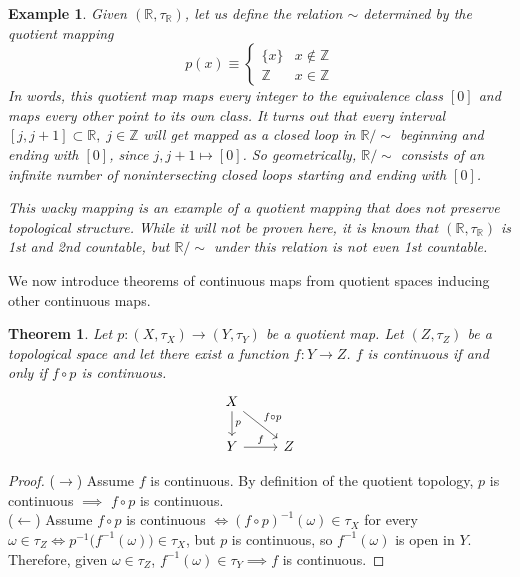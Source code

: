 \documentclass{article}
\newtheorem{theorem}{Theorem}[section]
\newtheorem{example}{Example}[section]
\theoremstyle{remark}
\theoremstyle{definition}
\begin{document}
\begin{example}
Given $(\mathbb{R}, \tau_{\mathbb{R}})$, let us define the relation $\sim$ determined by the quotient mapping
\[p(x) \equiv \begin{cases}
      \{x\} & x \not\in \mathbb{Z} \\
      \mathbb{Z} & x \in \mathbb{Z}
\end{cases}\]
In words, this quotient map maps every integer to the equivalence class $[0]$ and maps every other point to its own class. It turns out that every interval $[j, j+1] \subset \mathbb{R}, \; j \in \mathbb{Z}$ will get mapped as a closed loop in $\mathbb{R} / \sim$ beginning and ending with $[0]$, since $j, j+1 \mapsto [0]$. So geometrically, $\mathbb{R} / \sim$ consists of an infinite number of nonintersecting closed loops starting and ending with $[0]$. 
\begin{center}
\end{center}

This wacky mapping is an example of a quotient mapping that does not preserve topological structure. While it will not be proven here, it is known that $(\mathbb{R}, \tau_{\mathbb{R}})$ is 1st and 2nd countable, but $\mathbb{R} / \sim$ under this relation is not even 1st countable. 
\end{example}

We now introduce theorems of continuous maps from quotient spaces inducing other continuous maps. 

\begin{theorem}
Let $p: (X, \tau_X) \longrightarrow (Y, \tau_Y)$ be a quotient map. Let $(Z, \tau_Z)$ be a topological space and let there exist a function $f: Y \longrightarrow Z$. $f$ is continuous if and only if $f \circ p$ is continuous. 
\[\begin{tikzcd}
    X \arrow{d}{p} \arrow{rd}{f \circ p}\\
    Y \arrow{r}{f} & Z
\end{tikzcd}\]
\end{theorem}
\begin{proof}
($\rightarrow$) Assume $f$ is continuous. By definition of the quotient topology, $p$ is continuous $\implies$ $f \circ p$ is continuous. \\
($\leftarrow$) Assume $f \circ p$ is continuous $\iff (f \circ p)^{-1} (\omega) \in \tau_X$ for every $\omega \in \tau_Z \iff p^{-1} \big( f^{-1}(\omega) \big) \in \tau_X$, but $p$ is continuous, so $f^{-1}(\omega)$ is open in $Y$. Therefore, given $\omega \in \tau_{Z}$, $f^{-1} (\omega) \in \tau_Y \implies f$ is continuous. 
\end{proof}
\end{document}
